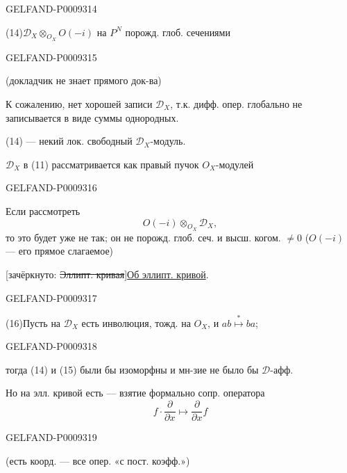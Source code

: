 \begin{GelfandAdjacentEvidence}{GELFAND-P000931}{4}


\hspace{2em}{\small например,}

(14)\quad $\mathcal D_X\otimes_{O_X}O(-i)$ на $P^N$ порожд. глоб. сечениями
\end{GelfandAdjacentEvidence}
\begin{GelfandAdjacentEvidence}{GELFAND-P000931}{5}


(докладчик не знает прямого док-ва)

К сожалению, нет хорошей записи $\mathcal D_X$, т.к. дифф. опер. глобально не записывается в виде суммы однородных.

(14) --- некий лок. свободный $\mathcal D_X$-модуль.

$\mathcal D_X$ в (11) рассматривается как правый пучок $O_X$-модулей
\end{GelfandAdjacentEvidence}
\begin{GelfandAdjacentEvidence}{GELFAND-P000931}{6}


Если рассмотреть
\begin{equation*}
 O(-i)\otimes_{O_X}\mathcal D_X,
 \tag{15}
\end{equation*}
то это будет уже не так; он не порожд. глоб. сеч. и высш. когом. $\ne0$ ($O(-i)$ --- его прямое слагаемое)

[зачёркнуто: \sout{Эллипт. кривая}]\qquad\underline{Об эллипт. кривой}.
\end{GelfandAdjacentEvidence}
\begin{GelfandAdjacentEvidence}{GELFAND-P000931}{7}


(16)\quad Пусть на $\mathcal D_X$ есть инволюция, тожд. на $O_X$, и \(ab\overset{*}{\mapsto}ba\);
\end{GelfandAdjacentEvidence}
\begin{GelfandAdjacentEvidence}{GELFAND-P000931}{8}


тогда (14) и (15) были бы изоморфны и мн-зие не было бы $\mathcal D$-афф.

Но на элл. кривой есть  --- взятие формально сопр. оператора
\[
 f\cdot\frac{\partial}{\partial x}\mapsto\frac{\partial}{\partial x}f
\]
\end{GelfandAdjacentEvidence}
\begin{GelfandAdjacentEvidence}{GELFAND-P000931}{9}


(есть коорд. --- все опер. «с пост. коэфф.»)
\end{GelfandAdjacentEvidence}



